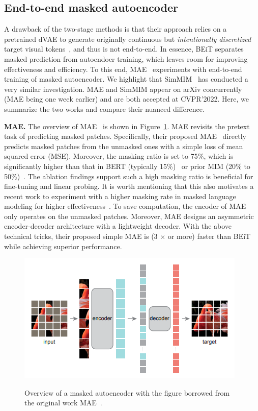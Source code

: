 \documentclass[10pt,journal,compsoc]{IEEEtran}
\begin{document}
\subsection{End-to-end masked autoencoder}
A drawback of the two-stage methods is that their approach relies on a pretrained dVAE to generate originally continuous but \textit{intentionally discretized} target visual tokens~\cite{yi2022masked}, and thus is not end-to-end. In essence, BEiT separates masked prediction from autoendoer training, which leaves room for improving effectiveness and efficiency. To this end, MAE~\cite{he2022masked} experiments with end-to-end training of masked autoencoder. We highlight that SimMIM~\cite{xie2022simmim} has conducted a very similar investigation. MAE and SimMIM appear on arXiv concurrently (MAE being one week earlier) and are both accepted at CVPR'2022. Here, we summarize the two works and compare their nuanced difference. %

\textbf{MAE.} The overview of MAE~\cite{he2022masked} is shown in Figure~\ref{fig:mae}. MAE revisits the pretext task of predicting masked patches. Specifically, their proposed MAE~\cite{he2022masked} directly predicts masked patches from the unmasked ones with a simple loss of mean squared error (MSE). Moreover, the masking ratio is set to 75\%, which is significantly higher than that in BERT (typically 15\%)~\cite{devlin2019bert} or prior MIM (20\% to 50\%)~\cite{chen2020generative, dosovitskiy2021an,bao2022beit}. The ablation findings support such a high masking ratio is beneficial for fine-tuning and linear probing. It is worth mentioning that this also motivates a recent work to experiment with a higher masking rate in masked language modeling for higher effectiveness~\cite{wettig2022should}. To save computation, the encoder of MAE only operates on the unmasked patches. Moreover, MAE designs an asymmetric encoder-decoder architecture with a lightweight decoder. With the above technical tricks, their proposed simple MAE is (3 $\times$ or more) faster than BEiT~\cite{bao2022beit} while achieving superior performance. 

\begin{figure}[!htbp]\centering
\includegraphics[width=.9\linewidth]{fig/MAE.png}\\
\caption{Overview of a masked autoencoder with the figure borrowed from the original work MAE~\cite{he2022masked}.
}
\label{fig:mae}
\vspace{-1em}
\end{figure}
\end{document}
